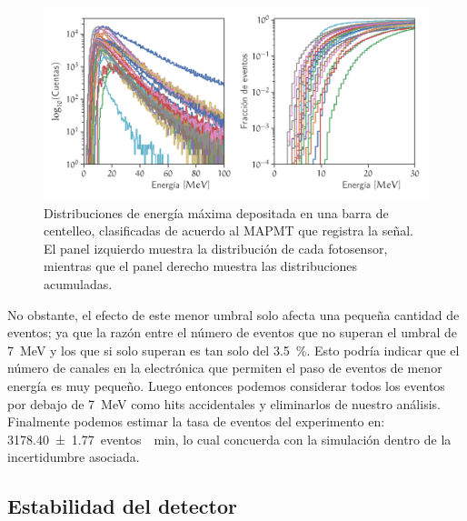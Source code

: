 \begin{figure}
        \centering
        \includegraphics[width=\textwidth]{scibar-threshold.pdf}
        \caption{Distribuciones de energía máxima depositada en una barra de centelleo, clasificadas de acuerdo al MAPMT que registra la señal. El panel izquierdo muestra la distribución de cada fotosensor, mientras que el panel derecho muestra las distribuciones acumuladas.}
        \label{fig:scibar-threshold}
\end{figure}

No obstante, el efecto de este menor umbral solo afecta una pequeña cantidad de eventos; ya que la razón entre el número de eventos que no superan el umbral de \SI{7}{\mega\electronvolt} y los que si solo superan es tan solo del \SI{3.5}{\percent}. Esto podría indicar que el número de canales en la electrónica que permiten el paso de eventos de menor energía es muy pequeño. Luego entonces podemos considerar todos los eventos por debajo de \SI{7}{\mega\electronvolt} como hits accidentales y eliminarlos de nuestro análisis. Finalmente podemos estimar la tasa de eventos del experimento en: \SI{3178.40(177)}{eventos \per\minute}, lo cual concuerda con la simulación dentro de la incertidumbre asociada.

\subsection{Estabilidad del detector}

